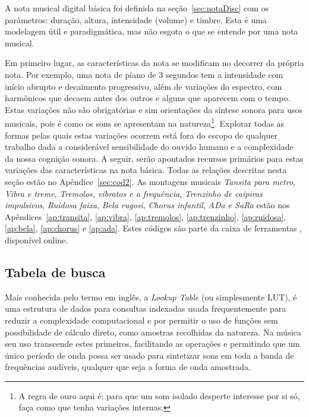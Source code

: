 A nota musical digital básica foi definida na seção~\ref{sec:notaDisc} com os parâmetros:
duração, altura, intensidade (volume) e timbre. Esta é uma modelagem
útil e paradigmática, mas não esgota o que se entende por
uma nota musical.

Em primeiro lugar, as características da nota se modificam no decorrer
da própria nota.\cite{Chowning} Por exemplo, uma nota de piano
de 3 segundos tem a intensidade com início abrupto e decaimento progressivo,
além de variações do espectro, com harmônicos que
decaem antes dos outros e alguns que aparecem com o tempo.
Estas variações não são obrigatórias e sim orientações da
síntese sonora para usos musicais, pois é como os sons
se apresentam na natureza\footnote{A regra de ouro
aqui é: para que um som isolado desperte interesse
por si só, faça como que tenha variações internas.\cite{Roederer}}. 
Explorar todas as formas pelas quais estas variações ocorrem está fora
do escopo de qualquer trabalho dada a considerável sensibilidade do ouvido humano
e a complexidade da nossa cognição sonora. A seguir, serão apontados
recursos primários para estas variações das características na nota
básica.
Todas as relações descritas nesta seção estão no Apêndice~\ref{sec:cod2}. As montagens musicais \emph{Tansita para metro}, \emph{Vibra e treme}, \emph{Tremolos, vibratos e a frequência}, \emph{Trenzinho de caipiras impulsivos}, \emph{Ruidosa faixa}, \emph{Bela rugosi}, \emph{Chorus infantil}, \emph{ADa e SaRa} estão nos Apêndices~\ref{ap:transita}, \ref{ap:vibra}, \ref{ap:tremolos}, \ref{ap:trenzinho}, \ref{ap:ruidosa}, \ref{ap:bela}, \ref{ap:chorus} e \ref{ap:ada}. Estes códigos são parte da caixa de ferramentas \massa, disponível online.\cite{MASSA}



\subsection{Tabela de busca}

Mais conhecida pelo termo em inglês, a \emph{Lookup Table} (ou simplesmente
LUT), é uma estrutura de dados para
consultas indexadas usada
frequentemente para reduzir a complexidade computacional
e por
permitir o uso de funções sem possibilidade de cálculo direto, como
amostras recolhidas da natureza. 
Na música seu uso transcende estes
primeiros, facilitando as operações e permitindo que um único
período de onda possa ser usado para sintetizar sons em toda a banda
de frequências audíveis, qualquer que seja a forma de onda amostrada.


